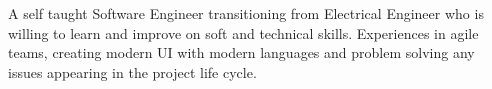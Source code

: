 


\begin{cvparagraph}


{A self taught Software Engineer transitioning from Electrical Engineer who is willing to learn and improve on soft and technical skills. Experiences in agile teams, creating modern UI with modern languages and problem solving any issues appearing in the project life cycle. }

\end{cvparagraph}
\vspace{-4mm}